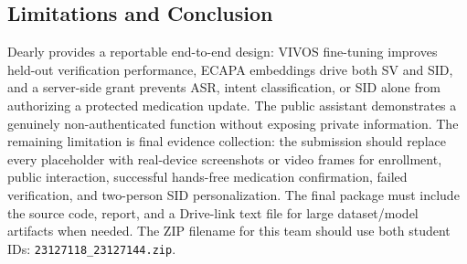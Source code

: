 \subsection{Limitations and Conclusion}
Dearly provides a reportable end-to-end design: VIVOS fine-tuning improves held-out verification performance, ECAPA embeddings drive both SV and SID, and a server-side grant prevents ASR, intent classification, or SID alone from authorizing a protected medication update. The public assistant demonstrates a genuinely non-authenticated function without exposing private information. The remaining limitation is final evidence collection: the submission should replace every placeholder with real-device screenshots or video frames for enrollment, public interaction, successful hands-free medication confirmation, failed verification, and two-person SID personalization. The final package must include the source code, report, and a Drive-link text file for large dataset/model artifacts when needed. The ZIP filename for this team should use both student IDs: \texttt{23127118\_23127144.zip}.
